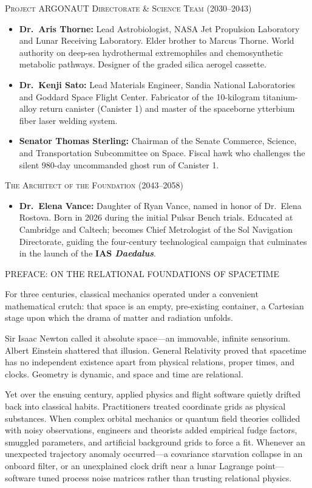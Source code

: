 \documentclass[12pt,twoside,openright]{book}
\newcommand{\sceneheader}[1]{%
  \par\vspace{1.8em}%
  {\noindent\centering\scshape\large #1\par}%
  \vspace{1.0em}%
  \noindent%
}
\newcommand{\dinkus}{%
  \par\vspace{1.2em}%
  {\noindent\centering{\large $\ast\quad\ast\quad\ast$}\par}%
  \vspace{1.2em}%
  \noindent%
}
\providecommand{\tightlist}{\setlength{\itemsep}{0pt}\setlength{\parskip}{0pt}
\setlength{\tabcolsep}{2pt}}
\begin{document}
\sceneheader{Project ARGONAUT Directorate \& Science Team
(2030--2043)}

\begin{itemize}
\tightlist
\item
  \textbf{Dr.~Aris Thorne:} Lead Astrobiologist, NASA Jet Propulsion
  Laboratory and Lunar Receiving Laboratory. Elder brother to Marcus
  Thorne. World authority on deep-sea hydrothermal extremophiles and
  chemosynthetic metabolic pathways. Designer of the graded silica
  aerogel cassette.
\item
  \textbf{Dr.~Kenji Sato:} Lead Materials Engineer, Sandia National
  Laboratories and Goddard Space Flight Center. Fabricator of the
  10-kilogram titanium-alloy return canister (Canister 1) and master of
  the spaceborne ytterbium fiber laser welding system.
\item
  \textbf{Senator Thomas Sterling:} Chairman of the Senate Commerce,
  Science, and Transportation Subcommittee on Space. Fiscal hawk who
  challenges the silent 980-day uncommanded ghost run of Canister 1.
\end{itemize}

\sceneheader{The Architect of the Foundation
(2043--2058)}

\begin{itemize}
\tightlist
\item
  \textbf{Dr.~Elena Vance:} Daughter of Ryan Vance, named in honor of
  Dr.~Elena Rostova. Born in 2026 during the initial Pulsar Bench
  trials. Educated at Cambridge and Caltech; becomes Chief Metrologist
  of the Sol Navigation Directorate, guiding the four-century
  technological campaign that culminates in the launch of the
  \textbf{IAS \emph{Daedalus}}.
\end{itemize}

\dinkus

\sceneheader{PREFACE: ON THE RELATIONAL FOUNDATIONS OF
SPACETIME}

For three centuries, classical mechanics operated under a convenient
mathematical crutch: that space is an empty, pre-existing container, a
Cartesian stage upon which the drama of matter and radiation unfolds.

Sir Isaac Newton called it absolute space---an immovable, infinite
sensorium. Albert Einstein shattered that illusion. General Relativity
proved that spacetime has no independent existence apart from physical
relations, proper times, and clocks. Geometry is dynamic, and space and
time are relational.

Yet over the ensuing century, applied physics and flight software
quietly drifted back into classical habits. Practitioners treated
coordinate grids as physical substances. When complex orbital mechanics
or quantum field theories collided with noisy observations, engineers
and theorists added empirical fudge factors, smuggled parameters, and
artificial background grids to force a fit. Whenever an unexpected
trajectory anomaly occurred---a covariance starvation collapse in an
onboard filter, or an unexplained clock drift near a lunar Lagrange
point---software tuned process noise matrices rather than trusting
relational physics.
\end{document}
